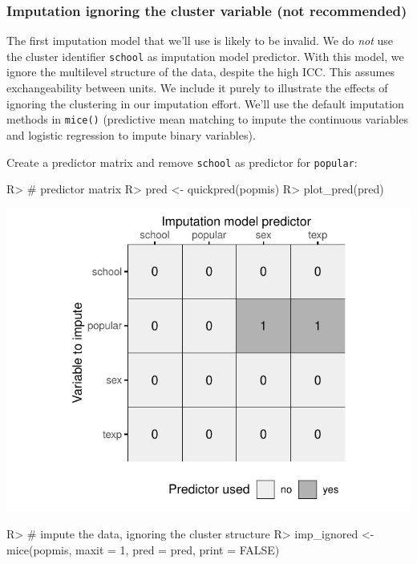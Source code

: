 \documentclass[
]{jss}
\begin{document}
\hypertarget{imputation-ignoring-the-cluster-variable-not-recommended}{%
\subsubsection{Imputation ignoring the cluster variable (not
recommended)}\label{imputation-ignoring-the-cluster-variable-not-recommended}}

The first imputation model that we'll use is likely to be invalid. We do
\emph{not} use the cluster identifier \texttt{school} as imputation
model predictor. With this model, we ignore the multilevel structure of
the data, despite the high ICC. This assumes exchangeability between
units. We include it purely to illustrate the effects of ignoring the
clustering in our imputation effort. We'll use the default imputation
methods in \texttt{mice()} (predictive mean matching to impute the
continuous variables and logistic regression to impute binary
variables).

Create a predictor matrix and remove \texttt{school} as predictor for
\texttt{popular}:

\begin{CodeChunk}
\begin{CodeInput}
R> # predictor matrix
R> pred <- quickpred(popmis)
R> plot_pred(pred)
\end{CodeInput}


\begin{center}\includegraphics{Imputation_of_Incomplete_Multilevel_Data_files/figure-latex/pop-ignored-1} \end{center}

\begin{CodeInput}
R> # impute the data, ignoring the cluster structure
R> imp_ignored <- mice(popmis, maxit = 1, pred = pred, print = FALSE)
\end{CodeInput}
\end{CodeChunk}
\end{document}
